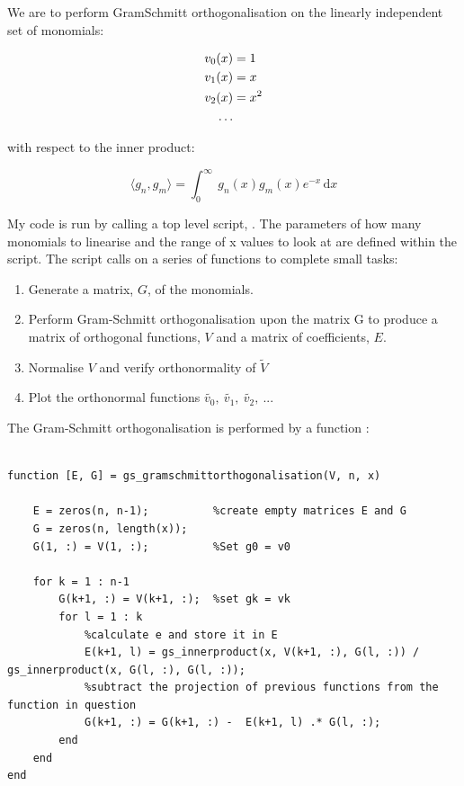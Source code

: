 \documentclass{article}
\begin{document}
We are to perform Gram\textunderscore Schmitt orthogonalisation on the linearly independent set of monomials:

$$
\begin{aligned}
v_0(x) &= 1 \\
v_1(x) &= x \\
v_2(x) &= x^2 \\
\ldots
\end{aligned} \\
$$


with respect to the inner product:

$$ 
\langle g_n, g_m \rangle = \int_0^\infty \ g_n(x)g_m(x)e^{-x} \, \mathrm{d}x 
$$

My code is run by calling a top level script, . The parameters of how many monomials to linearise and the range of x values to look at are defined within the script. The script calls on a series of functions to complete small tasks:

\begin{enumerate}
  \item Generate a matrix, $G$, of the monomials.
  \item Perform Gram-Schmitt orthogonalisation upon the matrix G to produce a matrix of orthogonal functions, $V$ and a matrix of coefficients, $E$.
  \item Normalise $V$ and verify orthonormality of $\tilde{V}$
  \item Plot the orthonormal functions $\tilde{v_0},\ \tilde{v_1},\ \tilde{v_2},\ ...   $
\end{enumerate}

The Gram-Schmitt orthogonalisation is performed by a function :


\begin{lstlisting}

function [E, G] = gs_gramschmittorthogonalisation(V, n, x)

    E = zeros(n, n-1);			%create empty matrices E and G
    G = zeros(n, length(x));
    G(1, :) = V(1, :);			%Set g0 = v0

    for k = 1 : n-1
        G(k+1, :) = V(k+1, :);	%set gk = vk
        for l = 1 : k
            %calculate e and store it in E
            E(k+1, l) = gs_innerproduct(x, V(k+1, :), G(l, :)) / gs_innerproduct(x, G(l, :), G(l, :));
            %subtract the projection of previous functions from the function in question 
            G(k+1, :) = G(k+1, :) -  E(k+1, l) .* G(l, :);
        end
    end
end


\end{lstlisting}
\end{document}
